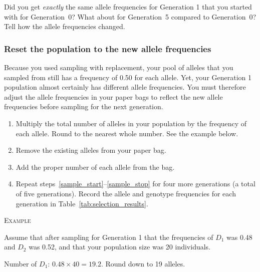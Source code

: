 \documentclass[12pt][hidelinks]{exam}
\newcommand{\allele}[1]{$#1$}
\begin{document}
\begin{questions}
	
	\question
	Did you get \emph{exactly} the same allele frequencies for
	Generation 1 that you started with for Generation~0? What about for 
	Generation~5 compared to Generation~0? Tell how the allele frequencies changed. 
	
	\vspace*{6\baselineskip}
	
\subsubsection*{Reset the population to the new allele frequencies}

Because you used sampling with replacement, your pool of alleles that 
you sampled from still has a frequency of 0.50 for each 
allele. Yet, your Generation 1 population almost certainly has 
different allele frequencies.  You must therefore adjust the
allele frequencies in your paper bags to reflect the new allele 
frequencies before sampling for the next generation.

\begin{enumerate} [resume]

	\item Multiply the total number of alleles in your population by the frequency of each allele. Round to the nearest whole number. See the example below.
	
	\item Remove the existing alleles from your paper bag.
	
	\item \label{sample_stop} Add the proper number of each allele from the bag.
	
	\item Repeat steps~\ref{sample_start}–\ref{sample_stop} for four more generations (a total of five generations). Record the allele and genotype frequencies for each generation in Table~\ref{tab:selection_results}. %
	
\end{enumerate} 

	\medskip
	
	\textsc{Example} 
	
	Assume that after sampling for Generation 1 that the frequencies of \allele{D_1} was 0.48 and \allele{D_2} was 0.52, and that your population size was 20 individuals.
	
	Number of \allele{D_1}: $0.48 \times 40 = 19.2.$ Round down to 19 alleles.
	

\end{questions}
\end{document}
